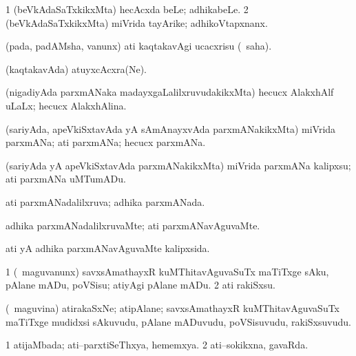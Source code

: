 \bentry
{}
\gl{\nA}
\bmng
\bnum
\num{1} (beVkAdaSaTxkikxMta) hecAcxda beLe; adhikabeLe. 
\num{2} (beVkAdaSaTxkikxMta) miVrida tayArike; adhikoVtapxnanx. 
\enum
\emng
\eentry


\bentry
{}
\gl{\sakirx}
\bmng
(pada, padAMsha, \mo vanunx) ati kaqtakavAgi ucacxrisu (\akirx\ saha). 
\emng
\eentry

\bentry
{}
\gl{\nA}
\bmng
(kaqtakavAda) atuyxcAcxra(Ne). 
\emng
\eentry


\bentry
{}
\gl{\gu}
\bmng
(nigadiyAda parxmANaka madayxgaLalilxruvudakikxMta) hecucx AlakxhAlf uLaLx; hecucx AlakxhAlina. 
\emng
\eentry


\bentry
{}
\gl{\nA}
\bmng
(sariyAda, apeVkiSxtavAda yA sAmAnayxvAda parxmANakikxMta) miVrida parxmANa; ati parxmANa; hecucx parxmANa. 
\emng
\eentry


\bentry
{}
\gl{\sakirx}
\bmng
(sariyAda yA apeVkiSxtavAda parxmANakikxMta) miVrida parxmANa kalipxsu; ati parxmANa uMTumADu. 
\emng
\eentry


\bentry
{}
\gl{\gu}
\bmng
ati parxmANadalilxruva; adhika parxmANada. 
\emng
\eentry


\bentry
{}
\gl{\kirxvi}
\bmng
adhika parxmANadalilxruvaMte; ati parxmANavAguvaMte. 
\emng
\eentry


\bentry
{}
\gl{\gu}
\bmng
ati yA adhika parxmANavAguvaMte kalipxsida. 
\emng
\eentry


\bentry
{}
\gl{\sakirx}
\bmng
\bnum
\num{1} (\kanmu\ maguvanunx) savxsAmathayxR kuMThitavAguvaSuTx maTiTxge sAku, pAlane mADu, poVSisu; atiyAgi pAlane mADu. 
\num{2} ati rakiSxsu. 
\enum
\emng
\eentry


\bentry
{}
\gl{\nA}
\bmng
(\kanmu\ maguvina) atirakaSxNe; atipAlane; savxsAmathayxR kuMThitavAguvaSuTx maTiTxge mudidxsi sAkuvudu, pAlane mADuvudu, poVSisuvudu, rakiSxsuvudu. 
\emng
\eentry


\bentry
{}
\gl{\gu}
\bmng
\bnum
\num{1} atijaMbada; ati--parxtiSeThxya, hememxya. 
\num{2} ati--sokikxna, gavaRda. 
\enum
\emng
\eentry


